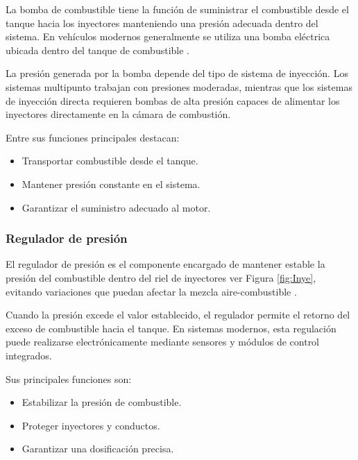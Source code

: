 La bomba de combustible tiene la función de suministrar el combustible desde el tanque hacia los inyectores manteniendo una presión adecuada dentro del sistema. En vehículos modernos generalmente se utiliza una bomba eléctrica ubicada dentro del tanque de combustible \citep{web_bomba_combustible}.

La presión generada por la bomba depende del tipo de sistema de inyección. Los sistemas multipunto trabajan con presiones moderadas, mientras que los sistemas de inyección directa requieren bombas de alta presión capaces de alimentar los inyectores directamente en la cámara de combustión.

Entre sus funciones principales destacan:
\begin{itemize}
    \item Transportar combustible desde el tanque.
    \item Mantener presión constante en el sistema.
    \item Garantizar el suministro adecuado al motor.
\end{itemize}

\subsubsection{Regulador de presión}

El regulador de presión es el componente encargado de mantener estable la presión del combustible dentro del riel de inyectores ver Figura \ref{fig:Inye}, evitando variaciones que puedan afectar la mezcla aire-combustible \citep{Bosch_Automotive}.

Cuando la presión excede el valor establecido, el regulador permite el retorno del exceso de combustible hacia el tanque. En sistemas modernos, esta regulación puede realizarse electrónicamente mediante sensores y módulos de control integrados.

Sus principales funciones son:
\begin{itemize}
    \item Estabilizar la presión de combustible.
    \item Proteger inyectores y conductos.
    \item Garantizar una dosificación precisa.
\end{itemize}


